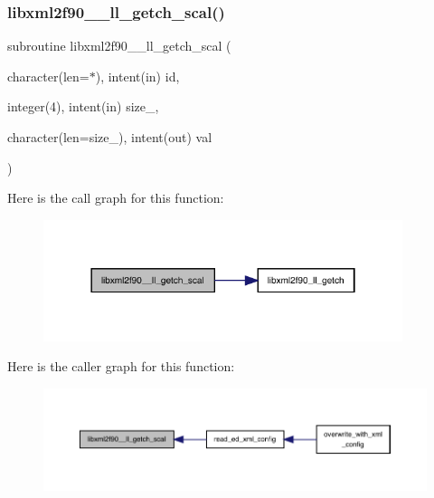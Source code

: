 \subsubsection{\texorpdfstring{libxml2f90\+\_\+\+\_\+ll\+\_\+getch\+\_\+scal()}{libxml2f90\_\_ll\_getch\_scal()}}
{\footnotesize\ttfamily subroutine libxml2f90\+\_\+\+\_\+ll\+\_\+getch\+\_\+scal (\begin{DoxyParamCaption}\item[{character(len=$\ast$), intent(in)}]{id,  }\item[{integer(4), intent(in)}]{size\+\_\+,  }\item[{character(len=size\+\_\+), intent(out)}]{val }\end{DoxyParamCaption})}

Here is the call graph for this function\+:
\nopagebreak
\begin{figure}[H]
\begin{center}
\leavevmode
\includegraphics[width=298pt]{libxml2f90_8f90__pp_8f90_ad30886dc2d259aec8eb502721e5347fc_cgraph}
\end{center}
\end{figure}
Here is the caller graph for this function\+:
\nopagebreak
\begin{figure}[H]
\begin{center}
\leavevmode
\includegraphics[width=350pt]{libxml2f90_8f90__pp_8f90_ad30886dc2d259aec8eb502721e5347fc_icgraph}
\end{center}
\end{figure}
\mbox{\label{libxml2f90_8f90__pp_8f90_a90fdd12e3f7794c98317d1b08550f01f}} 
